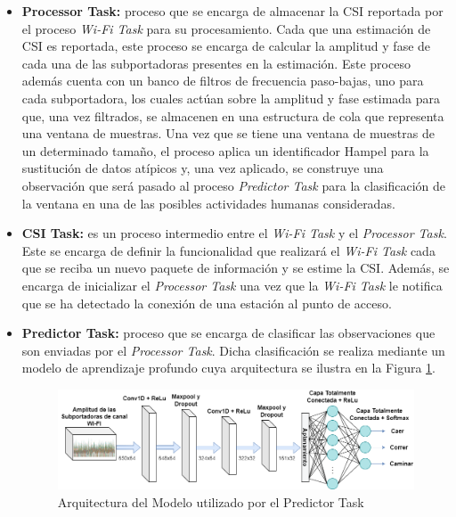 \documentclass{scrreprt}
\begin{document}
\begin{itemize}
  \item \textbf{Processor Task: } proceso que se encarga de almacenar la CSI reportada por el proceso \emph{Wi-Fi Task} para su procesamiento. Cada que una estimación de CSI es reportada, este proceso se encarga de calcular la amplitud y fase de cada una de las subportadoras presentes en la estimación. Este proceso además cuenta con un banco de filtros de frecuencia paso-bajas, uno para cada subportadora, los cuales actúan sobre la amplitud y fase estimada para que, una vez filtrados, se almacenen en una estructura de cola que representa una ventana de muestras. Una vez que se tiene una ventana de muestras de un determinado tamaño, el proceso aplica un identificador Hampel para la sustitución de datos atípicos y, una vez aplicado, se construye una observación que será pasado al proceso \emph{Predictor Task} para la clasificación de la ventana en una de las posibles actividades humanas consideradas. 
  \item \textbf{CSI Task: } es un proceso intermedio entre el \emph{Wi-Fi Task} y el \emph{Processor Task}. Este se encarga de definir la funcionalidad que realizará el \emph{Wi-Fi Task} cada que se reciba un nuevo paquete de información y se estime la CSI. Además, se encarga de inicializar el \emph{Processor Task} una vez que la \emph{Wi-Fi Task} le notifica que se ha detectado la conexión de una estación al punto de acceso. 
  \item \textbf{Predictor Task: } proceso que se encarga de clasificar las observaciones que son enviadas por el \emph{Processor Task}. Dicha clasificación se realiza mediante un modelo de aprendizaje profundo cuya arquitectura se ilustra en la Figura \ref{fig:DL}. 
  
    \begin{figure}[h!]
        \centering
        \includegraphics[scale = 0.42]{images/DL_architecture.drawio.png}
        \caption{Arquitectura del Modelo utilizado por el Predictor Task}
        \label{fig:DL}
    \end{figure}
\end{itemize}

\end{document}
